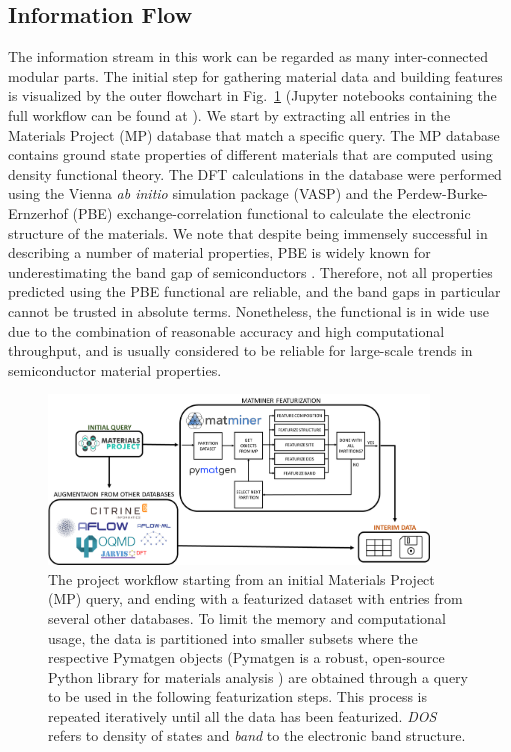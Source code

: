 \documentclass[superscriptaddress,
preprint,
 amsmath,amssymb,
 aps,
]{revtex4-2}
\begin{document}
\subsection*{Information Flow} 
The information stream in this work can be regarded as many inter-connected modular parts. 
The initial step for gathering material data and building features is visualized by the outer flowchart in Fig.~\ref{fig:flowchart} (Jupyter notebooks containing the full 
workflow can be found at \cite{Ohebbi2021}).
We start by extracting all entries in the Materials Project (MP) database  \cite{Jain2013,Jain2018} that match a specific query.  
The MP database contains ground state properties of different materials that are computed using density functional theory. The DFT calculations in the database were performed using the Vienna {\em ab initio} simulation package (VASP) \cite{Kresse1996} and the Perdew-Burke-Ernzerhof (PBE) \cite{Perdew1996} exchange-correlation functional to calculate the electronic structure of the materials. 
We note that despite being immensely successful in describing a number of material properties, PBE is widely known for underestimating the band gap of semiconductors \cite{Freysoldt2014}. Therefore, not all properties predicted using the PBE functional are reliable, and the band gaps in particular cannot be trusted in absolute terms. Nonetheless, the functional is in wide use due to the combination of reasonable accuracy and high computational throughput, and is usually considered to be reliable for large-scale trends in semiconductor material properties. 

\begin{figure}[t]
    \centering
    \includegraphics[width=0.9\textwidth]{figure2.png}
    \caption{The project workflow starting from an initial Materials Project (MP) query, and ending with a featurized dataset with entries from several other databases. 
    To limit the memory and computational usage, the data is partitioned into smaller subsets where the respective Pymatgen objects (Pymatgen is a robust, open-source Python library for materials analysis \cite{pymatgen}) are obtained through a query to be used in the following featurization steps. This process is repeated iteratively until all the data has been featurized. \emph{DOS} refers to density of states and \emph{band} to the electronic band structure. 
    }
    \label{fig:flowchart}
\end{figure}
\end{document}
